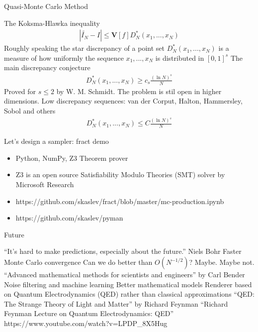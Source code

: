 \documentclass[pdf]
{beamer}
\begin{document}
\begin{frame}{Quasi-Monte Carlo Method}
  \begin{outline}
    \pause
  \1 The Koksma-Hlawka inequality
  \begin{align*}
    \left| \widetilde{I_N} - I \right| \leq \mathbf{V}[f] D_N^{*}(x_1, ..., x_N)
  \end{align*}
    \pause
  \1 Roughly speaking the star discrepancy of a point set $D_N^{*}(x_1, ..., x_N)$ is a
    measure of how uniformly the sequence $x_1, ..., x_N$ is distributed in $[0, 1]^s$
    \pause
  \1 The main discrepancy conjecture
  \begin{align*}
    D_N^{*}(x_1, ..., x_N) \geq c_s \frac{(\ln{N})^{s}}{N}
  \end{align*}
    \pause
  \2 Proved for $s \leq 2$ by W. M. Schmidt. The problem is stil open in higher dimensions.
    \pause
  \1 Low discrepancy sequences: van der Corput, Halton, Hammersley, Sobol and others
  \begin{align*}
    D_N^{*}(x_1, ..., x_N) \leq C \frac{(\ln{N})^{s}}{N}
  \end{align*}
  \end{outline}
\end{frame}

\begin{frame}{Let's design a sampler: fract demo}
  \begin{itemize}
    \small
    \pause
  \item Python, NumPy, Z3 Theorem prover
    \pause
  \item Z3 is an open source Satisfiability Modulo Theories (SMT) solver by Microsoft Research
    \pause
  \item https://github.com/skaslev/fract/blob/master/mc-production.ipynb
    \pause
  \item https://github.com/skaslev/pyman
  \end{itemize}
\end{frame}

\begin{frame}{Future}
  \begin{outline}
    \pause
    \1 ``It's hard to make predictions, especially about the future.'' \pause Niels Bohr
    \pause
    \1 Faster Monte Carlo convergence
    \pause
    \2 Can we do better than $O(N^{-1/2})$? \pause Maybe. \pause Maybe not.
    \pause
    \2 ``Advanced mathematical methods for scientists and engineers'' by Carl Bender
    \pause
    \1 Noise filtering and machine learning
    \pause
    \1 Better mathematical models
    \pause
    \2 Renderer based on Quantum Electrodynamics (QED) rather than classical approximations
    \pause
    \2 ``QED: The Strange Theory of Light and Matter'' by Richard Feynman
    \pause
    \2 ``Richard Feynman Lecture on Quantum Electrodynamics: QED'' https://www.youtube.com/watch?v=LPDP\_8X5Hug
    \pause
  \end{outline}
\end{frame}
\end{document}
